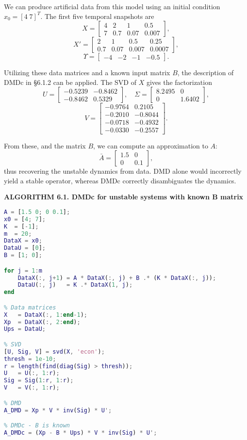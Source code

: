 \documentclass{article}
\begin{document}
We can produce artificial data from this model using an initial condition
$x_0 = [4 \; 7]^T$. The first five temporal snapshots are
\[
X =
\begin{bmatrix}
4 & 2 & 1 & 0.5 \\
7 & 0.7 & 0.07 & 0.007
\end{bmatrix},
\]
\[
X' =
\begin{bmatrix}
2 & 1 & 0.5 & 0.25 \\
0.7 & 0.07 & 0.007 & 0.0007
\end{bmatrix},
\]
\[
\Upsilon =
\begin{bmatrix}
-4 & -2 & -1 & -0.5
\end{bmatrix}.
\]

Utilizing these data matrices and a known input matrix $B$, the description of DMDc 
in §6.1.2 can be applied.  
The SVD of $X$ gives the factorization
\[
U =
\begin{bmatrix}
-0.5239 & -0.8462 \\
-0.8462 & 0.5329
\end{bmatrix},
\quad
\Sigma =
\begin{bmatrix}
8.2495 & 0 \\
0 & 1.6402
\end{bmatrix},
\]
\[
V =
\begin{bmatrix}
-0.9764 & 0.2105 \\
-0.2010 & -0.8044 \\
-0.0718 & -0.4932 \\
-0.0330 & -0.2557
\end{bmatrix}. 
\]

From these, and the matrix $B$, we can compute an approximation to $A$:
\[
    \bar{A} =
    \begin{bmatrix}
    1.5 & 0 \\
    0 & 0.1
    \end{bmatrix},
\]
thus recovering the unstable dynamics from data.  
DMD alone would incorrectly yield a stable operator, whereas DMDc correctly
disambiguates the dynamics.

\bigskip
\noindent\textbf{ALGORITHM 6.1. DMDc for unstable systems with known B matrix}
\begin{lstlisting}[language=Matlab, caption={}]
% Data collection
A = [1.5 0; 0 0.1];
x0 = [4; 7];
K  = [-1];
m  = 20;
DataX = x0;
DataU = [0];
B = [1; 0];

for j = 1:m
    DataX(:, j+1) = A * DataX(:, j) + B .* (K * DataX(:, j));
    DataU(:, j)   = K .* DataX(1, j);
end

% Data matrices
X   = DataX(:, 1:end-1);
Xp  = DataX(:, 2:end);
Ups = DataU;

% SVD
[U, Sig, V] = svd(X, 'econ');
thresh = 1e-10;
r = length(find(diag(Sig) > thresh));
U   = U(:, 1:r);
Sig = Sig(1:r, 1:r);
V   = V(:, 1:r);

% DMD
A_DMD = Xp * V * inv(Sig) * U';

% DMDc - B is known
A_DMDc = (Xp - B * Ups) * V * inv(Sig) * U';
\end{lstlisting}
\end{document}
